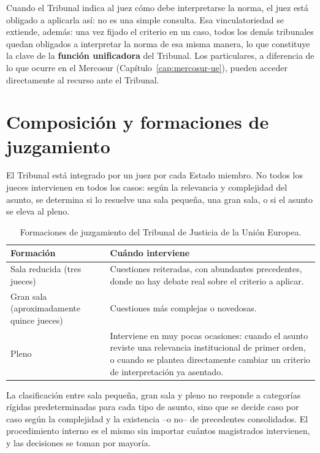 \documentclass[12pt,oneside]{book}
\begin{document}
Cuando el Tribunal indica al juez cómo debe interpretarse la norma, el juez está obligado a aplicarla así: no es una simple consulta. Esa vinculatoriedad se extiende, además: una vez fijado el criterio en un caso, todos los demás tribunales quedan obligados a interpretar la norma de esa misma manera, lo que constituye la clave de la \textbf{función unificadora} del Tribunal. Los particulares, a diferencia de lo que ocurre en el Mercosur (Capítulo~\ref{cap:mercosur-ue}), pueden acceder directamente al recurso ante el Tribunal.

\section{Composición y formaciones de juzgamiento}

El Tribunal está integrado por un juez por cada Estado miembro. No todos los jueces intervienen en todos los casos: según la relevancia y complejidad del asunto, se determina si lo resuelve una sala pequeña, una gran sala, o si el asunto se eleva al pleno.

\begin{table}[H]
\centering
\renewcommand{\arraystretch}{1.25}
\begin{tabularx}{\textwidth}{>{\raggedright\arraybackslash}p{}>{\raggedright\arraybackslash}X}
\toprule
\textbf{Formación} & \textbf{Cuándo interviene} \\
\midrule
Sala reducida (tres jueces) & Cuestiones reiteradas, con abundantes precedentes, donde no hay debate real sobre el criterio a aplicar. \\
Gran sala (aproximadamente quince jueces) & Cuestiones más complejas o novedosas. \\
Pleno & Interviene en muy pocas ocasiones: cuando el asunto reviste una relevancia institucional de primer orden, o cuando se plantea directamente cambiar un criterio de interpretación ya asentado. \\
\bottomrule
\end{tabularx}
\caption{Formaciones de juzgamiento del Tribunal de Justicia de la Unión Europea.}
\end{table}

La clasificación entre sala pequeña, gran sala y pleno no responde a categorías rígidas predeterminadas para cada tipo de asunto, sino que se decide caso por caso según la complejidad y la existencia --o no-- de precedentes consolidados. El procedimiento interno es el mismo sin importar cuántos magistrados intervienen, y las decisiones se toman por mayoría.
\end{document}
